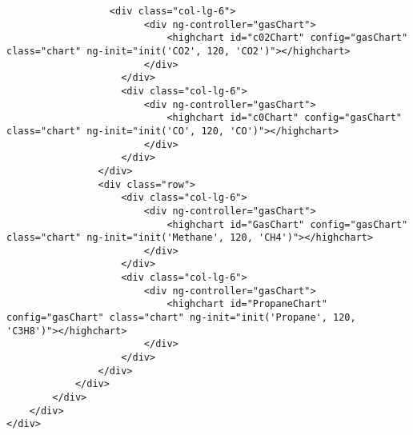 \begin{verbatim}
                  <div class="col-lg-6">
                        <div ng-controller="gasChart">
                            <highchart id="c02Chart" config="gasChart" class="chart" ng-init="init('CO2', 120, 'CO2')"></highchart>
                        </div>
                    </div>
                    <div class="col-lg-6">
                        <div ng-controller="gasChart">
                            <highchart id="c0Chart" config="gasChart" class="chart" ng-init="init('CO', 120, 'CO')"></highchart>
                        </div>
                    </div>
                </div>
                <div class="row">
                    <div class="col-lg-6">
                        <div ng-controller="gasChart">
                            <highchart id="GasChart" config="gasChart" class="chart" ng-init="init('Methane', 120, 'CH4')"></highchart>
                        </div>
                    </div>
                    <div class="col-lg-6">
                        <div ng-controller="gasChart">
                            <highchart id="PropaneChart" config="gasChart" class="chart" ng-init="init('Propane', 120, 'C3H8')"></highchart>
                        </div>
                    </div>
                </div>
            </div>
        </div>
    </div>
</div>
\end{verbatim}


